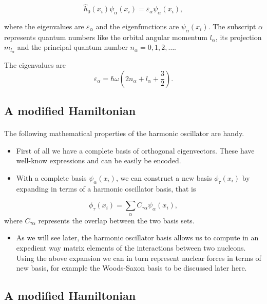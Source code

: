 \documentclass[%
twoside,                 %
final,                   %
10pt]{article}
\begin{document}
\[
  \hat{h}_0(x_i)\psi_{\alpha}(x_i)=\varepsilon_{\alpha}\psi_{\alpha}(x_i),  
\]

where the eigenvalues are $\varepsilon_{\alpha}$ and the eigenfunctions are $\psi_{\alpha}(x_i)$. The subscript $\alpha$ represents quantum numbers like the orbital angular momentum $l_{\alpha}$, its projection $m_{l_{\alpha}}$ and the   
principal quantum number $n_{\alpha}=0,1,2,\dots$. 

The eigenvalues are
\[
\varepsilon_{\alpha} = \hbar\omega \left(2n_{\alpha}+l_{\alpha}+\frac{3}{2}\right).
\]




\subsection*{A modified Hamiltonian}

\paragraph{}
The following mathematical properties of the  harmonic oscillator are handy. 
\begin{itemize}
 \item First of all we have a complete basis of orthogonal eigenvectors. These have well-know expressions and can be easily be encoded. 

 \item With a complete basis $\psi_{\alpha}(x_i)$, we can construct a new basis $\phi_{\tau}(x_i)$ by expanding in terms of a harmonic oscillator basis, that is  
\end{itemize}

\noindent
\[
\phi_{\tau}(x_i)=\sum_{\alpha} C_{\tau\alpha}\psi_{\alpha}(x_i),
\]
where $C_{\tau\alpha}$ represents the overlap between the two basis sets. 
\begin{itemize}
 \item As we will see later, the harmonic oscillator basis allows us to compute in an expedient way matrix elements of the interactions between two nucleons.  Using the above expansion we can in turn represent nuclear forces in terms of new basis, for example the  Woods-Saxon basis  to be discussed later here.
\end{itemize}

\noindent




\subsection*{A modified Hamiltonian}
\end{document}
